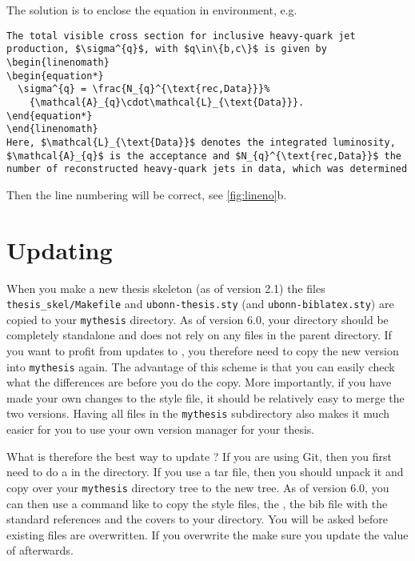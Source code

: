 The solution is to enclose the equation in  environment, e.g.
\begin{verbatim}
The total visible cross section for inclusive heavy-quark jet
production, $\sigma^{q}$, with $q\in\{b,c\}$ is given by
\begin{linenomath}
\begin{equation*}
  \sigma^{q} = \frac{N_{q}^{\text{rec,Data}}}%
    {\mathcal{A}_{q}\cdot\mathcal{L}_{\text{Data}}}.
\end{equation*}
\end{linenomath}
Here, $\mathcal{L}_{\text{Data}}$ denotes the integrated luminosity,
$\mathcal{A}_{q}$ is the acceptance and $N_{q}^{\text{rec,Data}}$ the
number of reconstructed heavy-quark jets in data, which was determined
\end{verbatim}
\noindent
Then the line numbering will be correct, see \cref{fig:lineno}b.


\section{Updating }%
\label{sec:tips:update}

When you make a new thesis skeleton (as of version 2.1) the files
\texttt{thesis\_skel/Makefile} and \texttt{ubonn-thesis.sty} 
(and \texttt{ubonn-biblatex.sty}) are copied
to your \texttt{mythesis} directory.
As of version 6.0, your  directory should be completely standalone
and does not rely on any files in the parent directory.
If you want to profit from updates to ,
you therefore need to copy the new version into \texttt{mythesis} again.
The advantage of this scheme is
that you can easily check what the differences are before you do the
copy. More importantly, if you have made your own changes to the style
file, it should be relatively easy to merge the two versions. Having
all files in the \texttt{mythesis} subdirectory also makes it much easier
for you to use your own version manager for your thesis.

What is therefore the best way to update ?
If you are using Git, then you first need to do a 
in the  directory.
If you use a tar file, then you should unpack it and copy over your
\texttt{mythesis} directory tree to the new  tree.
As of version 6.0, you can then use a command like
 to copy the style files,
the , the bib file with the standard references and the covers to your
 directory.
You will be asked before existing files are overwritten.
If you overwrite the  make sure you update the value of  afterwards.

